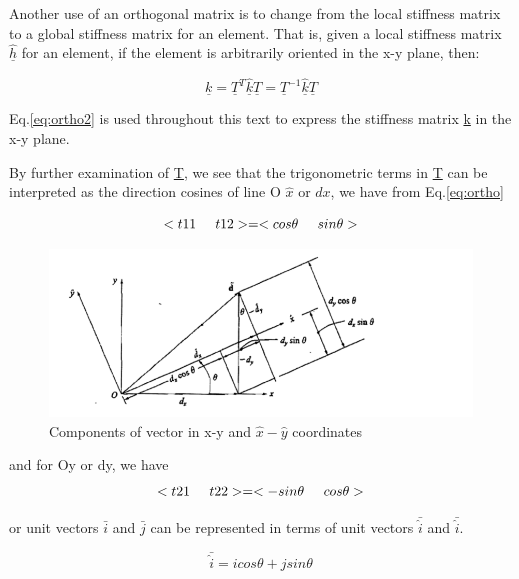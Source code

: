\documentclass[12pt]{report}
\newcommand{\eref}[1]{
	Eq.\ref{#1}
}
\begin{document}
Another use of an orthogonal matrix is to change from the local
stiffness matrix to a global stiffness matrix for an element. That is,
given a local stiffness matrix $\hat{\underline{h}}$ for an element, if the
element is arbitrarily oriented in the x-y plane, then:

\begin{equation}
	\underline{k}=\underline{T}^T \hat{\underline{k}}\underline{T}=
	\underline{T}^{-1}\hat{\underline{k}}\underline{T}
	\label{eq:ortho2}
\end{equation}

\eref{eq:ortho2} is used throughout this text to express the
stiffness matrix \underline{k} in the x-y plane.

By further examination of \underline{T}, we see that the trigonometric terms 
in \underline{T} can be interpreted as the direction cosines of line O
$\hat{x}$ or $d{x}$, we have from \eref{eq:ortho}

\begin{equation}
	<{t11}\hspace{0.5cm}{t12}>=<{cos\theta}\hspace{0.5cm}{sin\theta}>
\end{equation}

\begin{figure}
	\includegraphics[scale=0.5]{ortho.PNG}
	\caption{Components of vector in x-y and $\hat{x}-\hat{y}$ coordinates} 
	\label{fig:orthof}
\end{figure}
and for Oy or dy, we have
\begin{equation}
	<{t21}\hspace{0.5cm}{t22}>=<{-sin\theta}\hspace{0.5cm}{cos\theta}>
\end{equation}

or unit vectors $\bar{i}$ and $\bar{j}$ can be represented in terms of
unit vectors $\bar{\hat{i}}$ and $\bar{\hat{i}}$.

\begin{equation}
	\bar{\hat{i}} =icos\theta+jsin\theta
\end{equation}
\end{document}
